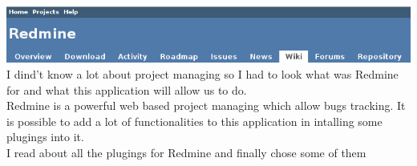 \includegraphics[width=\textwidth]{Images/redmine.png}
\newline
\\
I dind't know a lot about project managing so I had to look what was Redmine for and what this application will allow us to do. \\ 
Redmine is a powerful web based project managing which allow bugs tracking. It is possible to add a lot of functionalities to this application in intalling  some plugings into it. \\ 
\newpage
I read about all the plugings for Redmine and finally chose some of them  
